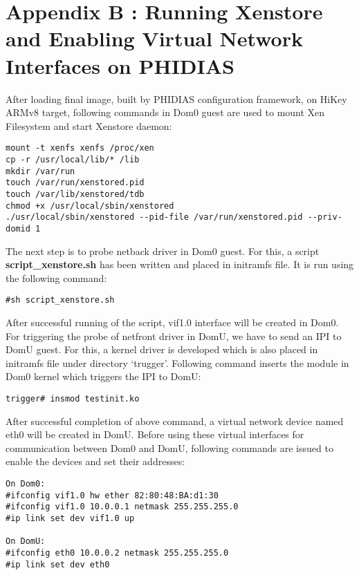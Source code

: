 \chapter{Appendix B : Running Xenstore and Enabling Virtual Network Interfaces on PHIDIAS \label{running_xenstore}}

After loading final image, built by PHIDIAS configuration framework, on HiKey ARMv8 target, following commands in Dom0 guest are used to mount Xen Filesystem and start Xenstore daemon:\\

\begin{lstlisting}[caption=Commands to mount xenfs and start Xenstore daemon,label={initcomms}]
mount -t xenfs xenfs /proc/xen
cp -r /usr/local/lib/* /lib
mkdir /var/run
touch /var/run/xenstored.pid
touch /var/lib/xenstored/tdb
chmod +x /usr/local/sbin/xenstored
./usr/local/sbin/xenstored --pid-file /var/run/xenstored.pid --priv-domid 1
\end{lstlisting}

The next step is to probe netback driver in Dom0 guest. For this, a script \textbf{script\_xenstore.sh} has been written and placed in initramfs file. It is run using the following command:

\begin{lstlisting}[caption= Running script to probe netback driver in Dom0]
#sh script_xenstore.sh
\end{lstlisting}

After successful running of the script, vif1.0 interface will be created in Dom0. For triggering the probe of netfront driver in DomU, we have to send an IPI to DomU guest. For this, a kernel driver is developed which is also placed in initramfs file under directory `trugger'. Following command inserts the module in Dom0 kernel which triggers the IPI to DomU:
\begin{lstlisting}[caption= Running driver to probe netfront in DomU]
trigger# insmod testinit.ko
\end{lstlisting}

After successful completion of above command, a virtual network device named eth0 will be created in DomU. Before using these virtual interfaces for communication between Dom0 and DomU, following commands are issued to enable the devices and set their addresses:
\begin{lstlisting}[caption= Enabling and setting addresses of virtual network interfaces]
On Dom0:
#ifconfig vif1.0 hw ether 82:80:48:BA:d1:30
#ifconfig vif1.0 10.0.0.1 netmask 255.255.255.0
#ip link set dev vif1.0 up

On DomU:
#ifconfig eth0 10.0.0.2 netmask 255.255.255.0
#ip link set dev eth0
\end{lstlisting}


\endinput
